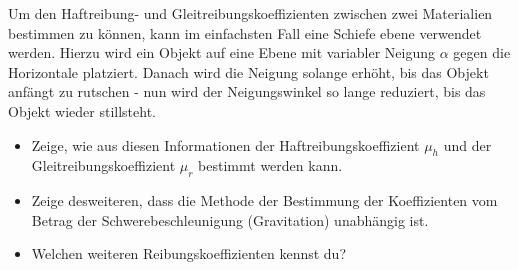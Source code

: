 
Um den Haftreibung- und Gleitreibungskoeffizienten zwischen zwei Materialien
bestimmen zu können, kann im einfachsten Fall eine Schiefe ebene verwendet
werden. Hierzu wird ein Objekt auf eine Ebene mit variabler Neigung $\alpha$
gegen die Horizontale platziert. Danach wird die Neigung solange erhöht, bis
das Objekt anfängt zu rutschen - nun wird der Neigungswinkel so lange reduziert,
bis das Objekt wieder stillsteht.

\begin{itemize}
	\item Zeige, wie aus diesen Informationen der Haftreibungskoeffizient $\mu_h$
		und der Gleitreibungskoeffizient $\mu_r$ bestimmt werden kann.
	\item Zeige desweiteren, dass die Methode der Bestimmung der Koeffizienten vom
		Betrag der Schwerebeschleunigung (Gravitation) unabhängig ist.
	\item Welchen weiteren Reibungskoeffizienten kennst du?
\end{itemize}
